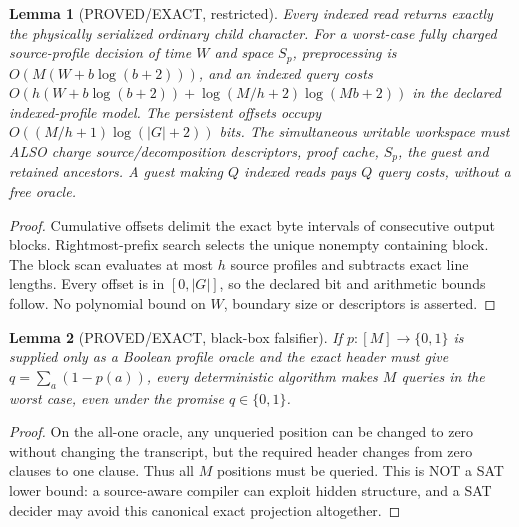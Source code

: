 \documentclass[11pt]{article}
\newtheorem{lemma}{Lemma}
\begin{document}
\begin{lemma}[PROVED/EXACT, restricted]
Every indexed read returns exactly the physically serialized ordinary
child character. For a worst-case fully charged source-profile decision
of time $W$ and space $S_p$, preprocessing is
$O(M(W+b\log(b+2)))$, and an indexed query costs
$O(h(W+b\log(b+2))+\log(M/h+2)\log(Mb+2))$ in the declared
indexed-profile model. The persistent offsets occupy
$O((M/h+1)\log(|G|+2))$ bits. The simultaneous writable workspace must
ALSO charge source/decomposition descriptors, proof cache, $S_p$,
the guest and retained ancestors. A guest making $Q$ indexed reads
pays $Q$ query costs, without a free oracle.
\end{lemma}
\begin{proof} Cumulative offsets delimit the exact byte intervals of
consecutive output blocks. Rightmost-prefix search selects the
unique nonempty containing block. The block scan evaluates at most $h$
source profiles and subtracts exact line lengths. Every offset is in
$[0,|G|]$, so the declared bit and arithmetic bounds follow. No
polynomial bound on $W$, boundary size or descriptors is asserted.
\end{proof}

\begin{lemma}[PROVED/EXACT, black-box falsifier]
If $p:[M]\to\{0,1\}$ is supplied \emph{only} as a Boolean profile
oracle and the exact header must give $q=\sum_a(1-p(a))$,
every deterministic algorithm makes $M$ queries in the worst case,
even under the promise $q\in\{0,1\}$.
\end{lemma}
\begin{proof} On the all-one oracle, any unqueried position can be
changed to zero without changing the transcript, but the required
header changes from zero clauses to one clause. Thus all $M$
positions must be queried. This is NOT a SAT lower bound: a
source-aware compiler can exploit hidden structure, and a SAT
decider may avoid this canonical exact projection altogether.
\end{proof}
\end{document}
